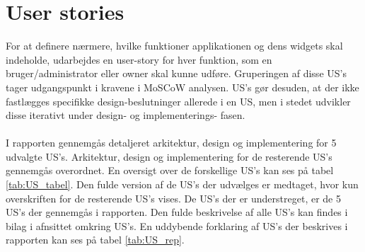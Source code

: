 \section{User stories} \label{sec:US}
For at definere nærmere, hvilke funktioner applikationen og dens widgets skal indeholde, udarbejdes en user-story for hver funktion, som en bruger/administrator eller owner skal kunne udføre. Gruperingen af disse US's tager udgangspunkt i kravene i MoSCoW analysen.
US's gør desuden, at der ikke fastlægges specifikke design-beslutninger allerede i en US, men i stedet udvikler disse iterativt under design- og implementerings- fasen.
\\ \\
\noindent I rapporten gennemgås detaljeret arkitektur, design og implementering for 5 udvalgte US's. Arkitektur, design og implementering for de resterende US's gennemgås overordnet. En oversigt over de forskellige US's kan ses på tabel \ref{tab:US_tabel}. Den fulde version af de US's der udvælges er medtaget, hvor kun overskriften for de resterende US's vises. De US's der er understreget, er de 5 US's der gennemgås i rapporten. Den fulde beskrivelse af alle US's kan findes i bilag i afnsittet omkring US's. En uddybende forklaring af US's der beskrives i rapporten kan ses på tabel \ref{tab:US_rep}.

